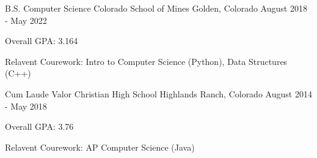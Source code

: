 

\begin{cventries}

  \cventry
    {B.S. Computer Science}
    {Colorado School of Mines} %
    {Golden, Colorado} %
    {August 2018 - May 2022} %
    {
      \begin{cvitems} %
        \item {Overall GPA: 3.164}
        \item {Relavent Courework: Intro to Computer Science (Python),
          Data Structures (C++)}
      \end{cvitems}
    }
    
  \cventry
    {Cum Laude}
    {Valor Christian High School} %
    {Highlands Ranch, Colorado} %
    {August 2014 - May 2018} %
    {
      \begin{cvitems} %
        \item {Overall GPA: 3.76}
        \item {Relavent Courework: AP Computer Science (Java) }
      \end{cvitems}
    }

\end{cventries}
